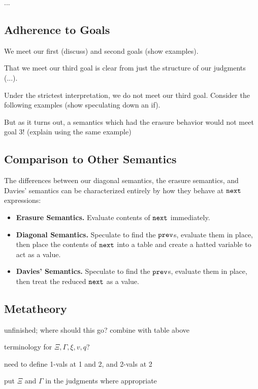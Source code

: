 \documentclass{sigplanconf}
\begin{document}
...

\subsection{Adherence to Goals}

We meet our first (discuss) and second goals (show examples).

That we meet our third goal is clear from just the structure of our judgments (...).

Under the strictest interpretation, we do not meet our third goal.  Consider the following examples (show speculating down an if).

But as it turns out, a semantics which had the erasure behavior would not meet goal 3! (explain using the same example)

\subsection{Comparison to Other Semantics}

The differences between our diagonal semantics, the erasure semantics, and Davies' semantics can be characterized entirely by how they behave at ${\tt next}$ expressions:
\begin{itemize}
\item {\bf Erasure Semantics.} Evaluate contents of ${\tt next}$ immediately.
\item {\bf Diagonal Semantics.} Speculate to find the ${\tt prev}$s, evaluate them in place, then place the contents of ${\tt next}$ into a table and create a hatted variable to act as a value.
\item {\bf Davies' Semantics.} Speculate to find the ${\tt prev}$s, evaluate them in place, then treat the reduced ${\tt next}$ as a value.
\end{itemize} 

\subsection{Metatheory}

\TODO unfinished; where should this go? combine with table above

\noindent\TODO terminology for $\Xi,\Gamma,\xi,v,q$?

\noindent\TODO need to define 1-vals at 1 and 2, and 2-vals at 2

\noindent\TODO put $\Xi$ and $\Gamma$ in the judgments where appropriate

\newcommand{\wf}{\ \mathsf{wf}}
\newcommand{\dom}[1]{\mathsf{dom}(#1)}
\newcommand{\valoo}{\ \bbone\textsf{-}\mathsf{val} @ \bbone}
\newcommand{\valot}{\ \bbone\textsf{-}\mathsf{val} @ \bbtwo}
\newcommand{\valtt}{\ \bbtwo\textsf{-}\mathsf{val} @ \bbtwo}
\end{document}
